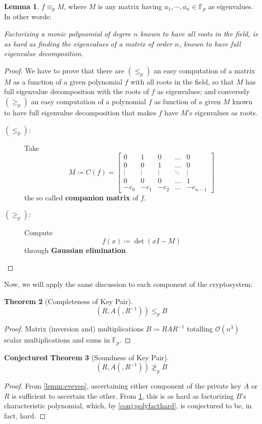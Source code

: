 \documentclass[a4paper,10pt]{article}
\theoremstyle{plain}
\newtheorem{thm}{Theorem}[section] %
\theoremstyle{definition}
\newtheorem{lemm}[thm]{Lemma} %
\newtheorem{cthm}[thm]{Conjectured Theorem} %
\theoremstyle{named}
\begin{document}
\begin{lemm}
\label{lemm:polmateq}
$f \equiv_p M$, where $M$ is any matrix having $a_1, \cdots, a_n \in \mathbb{F}_p$ as eigenvalues. In other words:

\textit{Factorizing a monic polynomial of degree $n$ known to have all roots in the field, is as hard as finding the eigenvalues of a matrix of order $n$, known to have full eigenvalue decomposition.}
\end{lemm}
\begin{proof}
We have to prove that there are $(\leq_p)$ an easy computation of a matrix $M$ as a function of a given polynomial $f$ with all roots in the field, so that $M$ has full eigenvalue decomposition with the roots of $f$ as eigenvalues; and conversely $(\geq_p)$ an easy computation of a polynomial $f$ as function of a given $M$ known to have full eigenvalue decomposition that makes $f$ have $M$'s eigenvalues as roots.
\begin{description}
\item [$(\leq_p)$:] Take \[M \coloneqq C(f) = \begin{bmatrix}
0 & 1 & 0 & \ldots & 0 \\
0 & 0 & 1 & \ldots & 0 \\
\vdots & \vdots & \vdots & \ddots & \vdots \\
0 & 0 & 0 & \ldots & 1 \\
-c_0 & -c_1 & -c_2 & \ldots & -c_{n-1}
\end{bmatrix} \]
the so called \textbf{companion matrix} of $f$.
\item [$(\geq_p)$:] Compute  \[f(x) \coloneqq \det(xI-M) \]
through \textbf{Gaussian elimination}.
\end{description}
\end{proof}

Now, we will apply the same discussion to each component of the cryptosystem:

\begin{thm}[Completeness of Key Pair]
 \[(R,A(,R^{-1}))\leq_p B\]
\end{thm}
\begin{proof}
Matrix (inversion and) multiplications $B \coloneqq RAR^{-1}$ totalling $\mathcal{O}(n^3)$ scalar multiplications and sums in $\mathbb{F}_p$.
\end{proof}

\begin{cthm}[Soundness of Key Pair]
 \[(R,A(,R^{-1}))\ngeq_p B\]
\end{cthm}
\begin{proof}
From \ref{lemm:eveveq}, ascertaining either component of the private key $A$ or $R$ is sufficient to ascertain the other. From \ref{lemm:polmateq}, this is as hard as factorizing $B$'s characteristic polynomial, which, by \ref{conj:polyfacthard}, is conjectured to be, in fact, hard.%
\end{proof}
\end{document}
